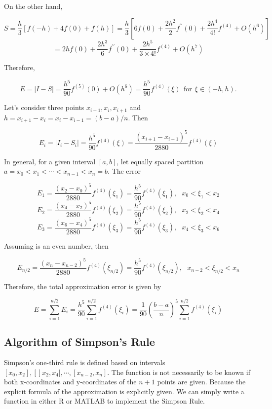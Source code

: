 \documentclass[
]{book}
\begin{document}
On the other hand,

\[
S = \frac{h}{3}[f(-h) + 4f(0) + f(h)] = \frac{h}{3}\left[6f(0) + \frac{2h^2}{2}f^{\prime\prime}(0) + \frac{2h^4}{4!} f^{(4)} + O(h^6) \right]
\]
\[
=2hf(0) + \frac{2h^3}{6}f^{\prime\prime}(0) + \frac{2h^5}{3\times 4!}f^{(4)} + O(h^7)
\]

Therefore,

\[
E = |I - S| = \frac{h^5}{90}f^{(5)}(0) + O(h^6) = \frac{h^5}{90}f^{(4)}(\xi)~~\text{for}~~ \xi\in(-h, h).
\]

Let's consider three points \(x_{i-1}, x_i, x_{i+1}\) and \(h = x_{i+1} - x_i = x_i - x_{i-1} = (b - a)/n\). Then

\[
E_i = |I_i - S_i| = \frac{h^5}{90}f^{(4)}(\xi) = \frac{(x_{i+1}-x_{i-1})^5}{2880}f^{(4)}(\xi)
\]

In general, for a given interval \([a, b]\), let equally spaced partition \(a = x_0 < x_1 < \cdots < x_{n-1} < x_n = b\). The error

\[
E_1 = \frac{(x_2-x_0)^5}{2880}f^{(4)}(\xi_1) = \frac{h^5}{90}f^{(4)}(\xi_1), ~~~ x_0 < \xi_1 < x_2 
\]
\[
E_2 = \frac{(x_4-x_2)^5}{2880}f^{(4)}(\xi_2) = \frac{h^5}{90}f^{(4)}(\xi_2), ~~~ x_2 < \xi_2 < x_4 
\]
\[
E_3 = \frac{(x_6-x_4)^5}{2880}f^{(4)}(\xi_3) = \frac{h^5}{90}f^{(4)}(\xi_3), ~~~ x_4 < \xi_3 < x_6 
\]

Assuming is an even number, then

\[
E_{n/2} = \frac{(x_n-x_{n-2})^5}{2880}f^{(4)}(\xi_{n/2}) = \frac{h^5}{90}f^{(4)}(\xi_{n/2}), ~~~ x_{n-2} < \xi_{n/2} < x_n \]

Therefore, the total approximation error is given by

\[
E = \sum_{i=1}^{n/2} E_i = \frac{h^5}{90}\sum_{i=1}^{n/2} f^{(4)}(\xi_i) = \frac{1}{90} \left(\frac{b-a}{n} \right)^5\sum_{i=1}^{n/2} f^{(4)}(\xi_i)
\]

\hypertarget{algorithm-of-simpsons-rule}{%
\subsection{Algorithm of Simpson's Rule}\label{algorithm-of-simpsons-rule}}

Simpson's one-third rule is defined based on intervals \([x_0, x_2], []x_2, x_4], \cdots, [x_{n-2}, x_n]\). The function is not necessarily to be known if both x-coordinates and y-coordinates of the \(n+1\) points are given. Because the explicit formula of the approximation is explicitly given. We can simply write a function in either R or MATLAB to implement the Simpson Rule.
\end{document}
